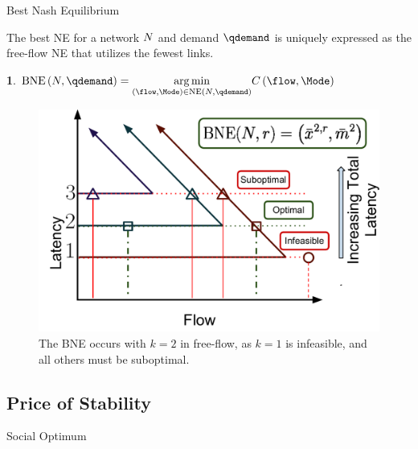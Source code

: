 \documentclass[english, smaller]{beamer}
\theoremstyle{plain}
\theoremstyle{definition}
\newtheorem{defn}[thm]{\protect\definitionname}
\theoremstyle{plain}
\theoremstyle{plain}
\providecommand{\definitionname}{Definition}
\begin{document}
\begin{frame}{Best Nash Equilibrium}

The best NE for a network $N$ and demand $\qdemand$ is uniquely
expressed as the free-flow NE that utilizes the fewest links.

\begin{defn}
$\BestNashEquilibrium{\NLinks}{\qdemand}=\underset{\left(\flow,\Mode\right)\in\NashEquilibrium{\NLinks}{\qdemand}}{\arg\min}\Latency\left(\flow,\Mode\right)$
\end{defn}

\begin{figure}
\begin{centering}
\includegraphics[scale=0.25]{../../figures/presentation/TheoremBestNashEquilibrium}
\par\end{centering}

\caption{The BNE occurs with $k=2$ in free-flow, as $k=1$ is infeasible,
and all others must be suboptimal.}
\end{figure}


\end{frame}

\subsection{Price of Stability}

\begin{frame}{Social Optimum}


\end{frame}
\end{document}
